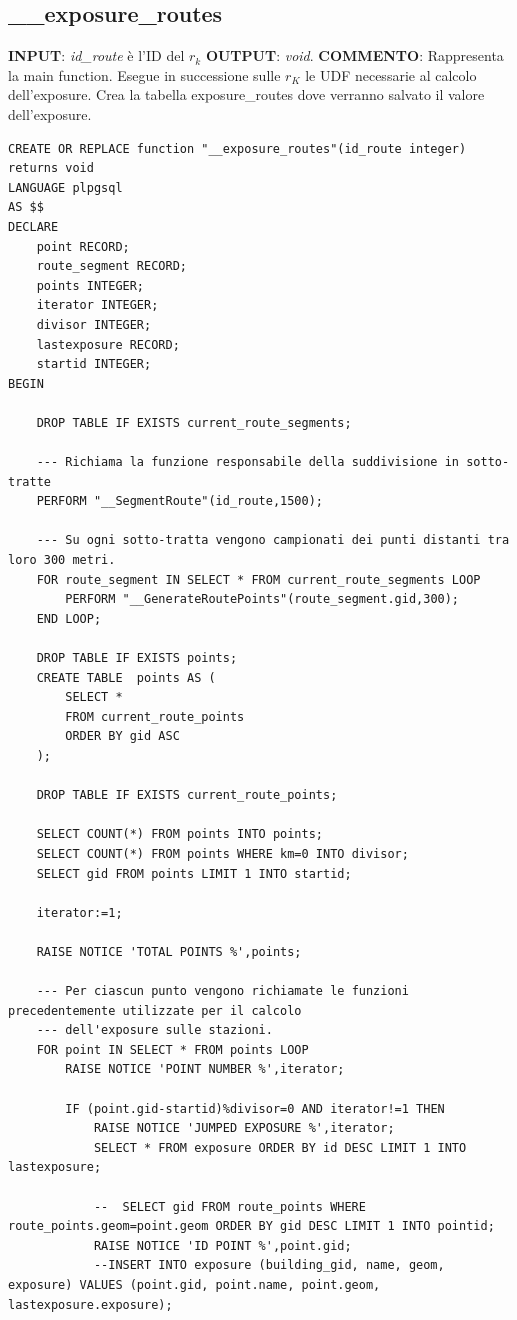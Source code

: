 \subsection{\_\_exposure\_routes}

\textbf{INPUT}: \textit{id\_route} è l'ID del $r_k$ \newline
\textbf{OUTPUT}: \textit{void}. \newline
\textbf{COMMENTO}: Rappresenta la main function. Esegue in successione sulle $r_K$ le UDF necessarie al calcolo dell’exposure. Crea la tabella exposure\_routes dove verranno salvato il valore dell’exposure.

\begin{lstlisting}[style = mystyle]
CREATE OR REPLACE function "__exposure_routes"(id_route integer) returns void
LANGUAGE plpgsql
AS $$
DECLARE
	point RECORD;
	route_segment RECORD;
	points INTEGER;
	iterator INTEGER;
	divisor INTEGER;
	lastexposure RECORD;
	startid INTEGER;
BEGIN

	DROP TABLE IF EXISTS current_route_segments;
	
	--- Richiama la funzione responsabile della suddivisione in sotto-tratte 
	PERFORM "__SegmentRoute"(id_route,1500);

	--- Su ogni sotto-tratta vengono campionati dei punti distanti tra loro 300 metri.
	FOR route_segment IN SELECT * FROM current_route_segments LOOP
		PERFORM "__GenerateRoutePoints"(route_segment.gid,300);
	END LOOP;

	DROP TABLE IF EXISTS points;
	CREATE TABLE  points AS (
		SELECT * 
		FROM current_route_points 
		ORDER BY gid ASC
	);
	
	DROP TABLE IF EXISTS current_route_points;

	SELECT COUNT(*) FROM points INTO points;
	SELECT COUNT(*) FROM points WHERE km=0 INTO divisor;
	SELECT gid FROM points LIMIT 1 INTO startid;
	
	iterator:=1;
	
	RAISE NOTICE 'TOTAL POINTS %',points;
	
	--- Per ciascun punto vengono richiamate le funzioni precedentemente utilizzate per il calcolo
	--- dell'exposure sulle stazioni.
	FOR point IN SELECT * FROM points LOOP
		RAISE NOTICE 'POINT NUMBER %',iterator;
		
		IF (point.gid-startid)%divisor=0 AND iterator!=1 THEN
			RAISE NOTICE 'JUMPED EXPOSURE %',iterator;
			SELECT * FROM exposure ORDER BY id DESC LIMIT 1 INTO lastexposure;

			--  SELECT gid FROM route_points WHERE route_points.geom=point.geom ORDER BY gid DESC LIMIT 1 INTO pointid;
			RAISE NOTICE 'ID POINT %',point.gid;
			--INSERT INTO exposure (building_gid, name, geom, exposure) VALUES (point.gid, point.name, point.geom, lastexposure.exposure);


\end{lstlisting}
